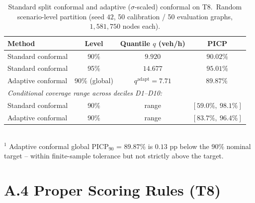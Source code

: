 \begin{table}[H]
\centering
\caption[Verified conformal prediction results]{Standard split conformal and adaptive ($\sigma$-scaled) conformal on T8.\ Random scenario-level partition (seed $42$, 50 calibration / 50 evaluation graphs, $1{,}581{,}750$ nodes each).}
\label{tab:app_conformal}
\begin{tabular}{lccc}
\toprule
Method & Level & Quantile $q$ (veh/h) & PICP \\
\midrule
Standard conformal & 90\% & $9.920$ & $90.02\%$ \\
Standard conformal & 95\% & $14.677$ & $95.01\%$ \\
Adaptive conformal & 90\% (global) & $q^\text{adapt} = 7.71$ & $89.87\%$\,\footnotemark[1] \\
\midrule
\multicolumn{4}{l}{\emph{Conditional coverage range across deciles D1--D10:}} \\
\midrule
Standard conformal & 90\% & range & $[59.0\%,\ 98.1\%]$ \\
Adaptive conformal & 90\% & range & $[83.7\%,\ 96.4\%]$ \\
\bottomrule
\end{tabular}
\\[2pt]
\footnotesize $^{1}$ Adaptive conformal global PICP$_{90}$ = $89.87\%$ is $0.13$ pp below the $90\%$ nominal target -- within finite-sample tolerance but not strictly above the target.
\end{table}

\section*{A.4 Proper Scoring Rules (T8)}\label{app:tab:scoring}

\begin{table}[H]
\centering
\caption[Verified proper scoring rule diagnostics]{CRPS, PIT and Winkler scores including PIT KS on the full $3{,}163{,}500$-node T8 test set.}
\label{tab:app_scoring}
\end{table}